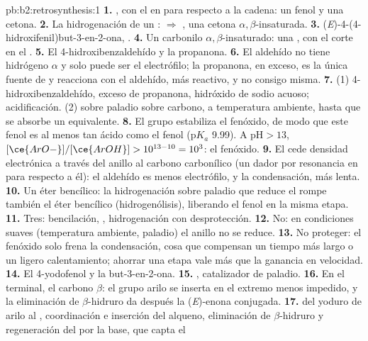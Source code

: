 \begin{solution}{pb:b2:retrosynthesis:1}
\textbf{1.} , con el  en para respecto a la cadena: un fenol y una cetona.
\textbf{2.} La hidrogenación de un :  $\Rightarrow$ , una
cetona $\alpha,\beta$-insaturada.
\textbf{3.} (\textit{E})-4-(4-hidroxifenil)but-3-en-2-ona, .
\textbf{4.} Un carbonilo $\alpha,\beta$-insaturado: una , con el corte en el .
\textbf{5.} El 4-hidroxibenzaldehído y la propanona.
\textbf{6.} El aldehído no tiene hidrógeno $\alpha$ y solo puede ser el electrófilo; la propanona, en
exceso, es la única fuente de  y reacciona con el aldehído, más reactivo, y no consigo misma.
\textbf{7.} (1) 4-hidroxibenzaldehído, exceso de propanona, hidróxido de sodio acuoso; acidificación. (2)
 sobre paladio sobre carbono, a temperatura ambiente, hasta que se absorbe un equivalente.
\textbf{8.} El grupo  estabiliza el fenóxido, de modo que este fenol es al menos tan ácido como el fenol
($\mathrm pK_a$ 9.99). A $\mathrm{pH} > 13$, $[\ce{ArO-}]/[\ce{ArOH}] > 10^{13-10} = 10^3$: el
fenóxido.
\textbf{9.} El  cede densidad electrónica a través del anillo al carbono carbonílico (un
dador por resonancia en para respecto a él): el aldehído es menos electrófilo, y la condensación, más lenta.
\textbf{10.} Un éter bencílico: la hidrogenación sobre paladio que reduce el  rompe también
el éter bencílico (hidrogenólisis), liberando el fenol en la misma etapa.
\textbf{11.} Tres: bencilación, , hidrogenación con desprotección.
\textbf{12.} No: en condiciones suaves (temperatura ambiente, paladio) el anillo  no se reduce.
\textbf{13.} No proteger: el fenóxido solo frena la condensación, cosa que compensan un tiempo más largo o un ligero
calentamiento; ahorrar una etapa vale más que la ganancia en velocidad.
\textbf{14.} El 4-yodofenol y la but-3-en-2-ona.
\textbf{15.} , catalizador de paladio.
\textbf{16.} En el  terminal, el carbono $\beta$: el grupo arilo se inserta en el extremo menos impedido,
y la eliminación de $\beta$-hidruro da después la (\textit{E})-enona conjugada.
\textbf{17.}  del yoduro de arilo al , coordinación e inserción del
alqueno, eliminación de $\beta$-hidruro y regeneración del  por la base, que capta el 

\end{solution}
